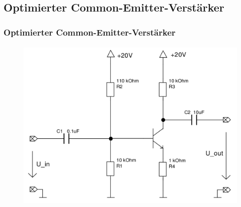 \subsection{Optimierter Common-Emitter-Verstärker} %
\label{sub:Optimierter_Common-Emitter-Verstärker}
\begin{frame}
    \frametitle{Optimierter Common-Emitter-Verstärker}
    \framesubtitle{}
    \begin{figure}[H]
    \begin{center}
            \includegraphics[scale=0.2]{./img/schaltungen/common_emitter_optimiert.png}
    \end{center}
    \end{figure}
\end{frame}
